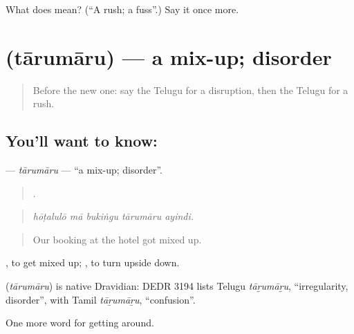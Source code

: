 \begin{tcolorbox}[breakable,colback=teal!4,colframe=teal!35!black,title={Before you move on}]
What does  mean? (\textquotedblleft{}A rush; a fuss\textquotedblright{}.) Say it once more.
\end{tcolorbox}
\section[\texorpdfstring{\te{తారుమారు} (tārumāru)}{తారుమారు (tārumāru)}]{ (tārumāru) — a mix-up; disorder}

\label{lesson:TE-C469-tarumaru}



\begin{quote}
Before the new one: say the Telugu for a disruption, then the Telugu for a rush.
\end{quote}

\subsection*{You'll want to know: }
\textbf{} — \emph{tārumāru} — \textquotedblleft{}a mix-up; disorder\textquotedblright{}.

\begin{quote}
    .
\end{quote}

\begin{quote}
\emph{hōṭalulō mā bukiṅgu tārumāru ayindi.}
\end{quote}

\begin{quote}
Our booking at the hotel got mixed up.
\end{quote}

 , to get mixed up;  , to turn upside down.

\begin{cousinweb}
\textbf{} (\emph{tārumāru}) is native Dravidian: DEDR 3194 lists Telugu \emph{tāṟumāṟu}, \textquotedblleft{}irregularity, disorder\textquotedblright{}, with Tamil \emph{tāṟumāṟu}, \textquotedblleft{}confusion\textquotedblright{}.
\end{cousinweb}

\begin{grammarlens}[title={What you've built}]
One more word for getting around.
\end{grammarlens}

